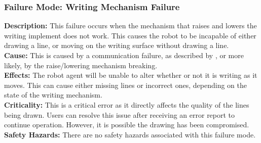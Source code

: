 \subsubsection{Failure Mode: Writing Mechanism Failure}
\label{sec:writing_fm_mechanism}
\textbf{Description:} This failure occurs when the mechanism that raises and lowers the writing implement does not work. This causes the robot to be incapable of either drawing a line, or moving on the writing surface without drawing a line.\\
\textbf{Cause:} This is caused by a communication failure, as described by , or more likely, by the raise/lowering mechanism breaking.\\
\textbf{Effects:} The robot agent will be unable to alter whether or not it is writing as it moves. This can cause either missing lines or incorrect ones, depending on the state of the writing mechanism.\\
\textbf{Criticality:} This is a critical error as it directly affects the quality of the lines being drawn. Users can resolve this issue after receiving an error report to continue operation. However, it is possible the drawing has been compromised.\\
\textbf{Safety Hazards:} There are no safety hazards associated with this failure mode.\\
